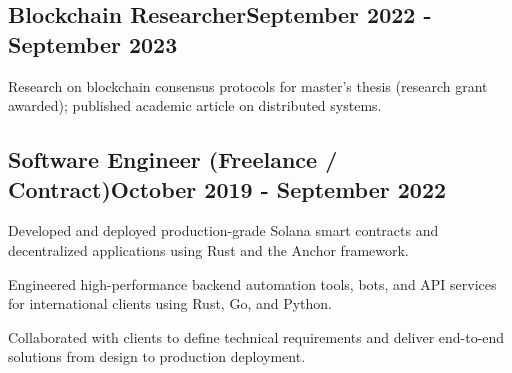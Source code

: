 \documentclass[a4paper,12pt]{article}
\begin{document}
\vspace*{1pt} 
\subsection{{Blockchain Researcher}\hfill September 2022 - September 2023}
\begin{zitemize}
    \item Research on blockchain consensus protocols for master's thesis (research grant awarded); published academic article on distributed systems.
\end{zitemize}

\vspace*{1pt} 
\subsection{{Software Engineer (Freelance / Contract)}\hfill October 2019 - September 2022}
\begin{zitemize}
  \item Developed and deployed production-grade Solana smart contracts and decentralized applications using Rust and the Anchor framework.
  \item Engineered high-performance backend automation tools, bots, and API services for international clients using Rust, Go, and Python.
  \item Collaborated with clients to define technical requirements and deliver end-to-end solutions from design to production deployment.
\end{zitemize}
\end{document}
